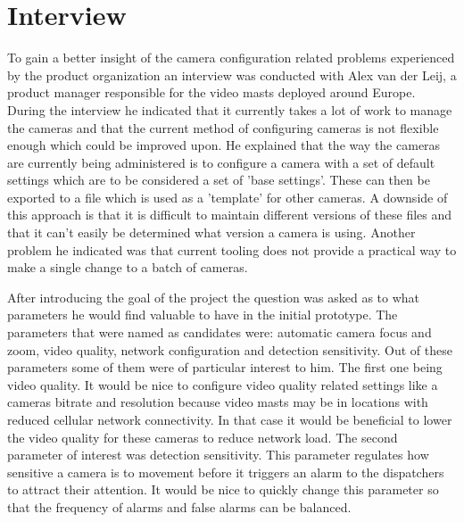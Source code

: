 
\section{Interview}
To gain a better insight of the camera configuration related problems experienced by the product organization an interview was conducted with Alex van der Leij, a product manager responsible for the video masts deployed around Europe.
During the interview he indicated that it currently takes a lot of work to manage
the cameras and that the current method of configuring cameras is not flexible enough which could be improved upon. He explained that the way the cameras are currently being
administered is to configure a camera with a set of default settings which are to be considered a set of 'base settings'. These can then be exported to a file which is used as a
'template' for other
cameras. A downside of this approach is that it is difficult to maintain different versions of these files and that it can't easily be determined what version a camera is using.
Another problem he indicated was that current tooling does not provide a practical way to make a single change to a batch of cameras.


After introducing the goal of the project the question was asked as to what parameters he would find valuable to have in the initial prototype.
The parameters that were named as candidates were: automatic camera focus and zoom, video quality, network configuration and detection sensitivity.
Out of these parameters some of them were of particular interest to him. The first one being video quality. It would be nice to configure video quality related settings like a
cameras bitrate and resolution because video masts may be in locations with reduced cellular network connectivity. In that case it would be beneficial to lower the video quality
for these cameras to reduce network load. The second parameter of interest was detection sensitivity. This parameter regulates how sensitive a camera is to movement before it
triggers an alarm to the dispatchers to attract their attention. It would be nice to quickly change this parameter so that the frequency of alarms and false alarms can be balanced.


